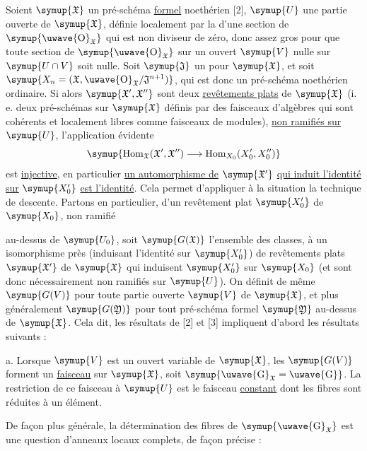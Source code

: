 Soient $\symup{\mathfrak X}$ un pré-schéma \uline{formel} noethérien [2], $\symup{U}$ une partie
ouverte de $\symup{\mathfrak X}$, définie localement par la  d'une
section de $\symup{\text{\uwave{O}}_{\mathfrak X}}$ qui est non
diviseur de zéro, donc assez gros pour
que toute section de $\symup{\text{\uwave{O}}_{\mathfrak X}}$ sur un ouvert $\symup{V}$ nulle sur
$\symup{U\cap V}$ soit nulle. Soit $\symup{\mathfrak J}$ un  pour
$\symup{\mathfrak X}$, et soit $\symup{X_n=(\mathfrak X,\text{\uwave{O}}_{\mathfrak X}/\mathfrak J^{n+1})}$, qui est donc un pré-schéma noethérien ordinaire. Si alors
$\symup{\mathfrak X',\mathfrak X''}$ sont deux \uline{revêtements plats} de $\symup{\mathfrak X}$
(i. e. deux pré-schémas sur $\symup{\mathfrak X}$ définis par des faisceaux d'algèbres
qui sont cohérents et localement libres comme faisceaux de modules), \uline{non
ramifiés sur} $\symup{U}$, l'application évidente
\[
  \symup{\operatorname{Hom}_{\mathfrak X}(\mathfrak X',\mathfrak X'')
  \longrightarrow
  \operatorname{Hom}_{X_0}(X'_0,X''_0)}
\]
est \uline{injective}, en particulier \uline{un automorphisme de} $\symup{\mathfrak X'}$ \uline{qui induit
l'identité sur} $\symup{X'_0}$ \uline{est l'identité}. Cela permet d'appliquer à la situation la
technique de descente. Partons en particulier, d'un revêtement plat $\symup{X'_0}$ de
$\symup{X_0}$, non ramifié

au-dessus de $\symup{U_0}$, soit $\symup{G(\mathfrak X)}$ l'ensemble des classes, à un
isomorphisme près (induisant l'identité sur $\symup{X'_0}$) de revêtements plats
$\symup{\mathfrak X'}$ de $\symup{\mathfrak X}$ qui induisent $\symup{X'_0}$ sur $\symup{X_0}$ (et sont donc
nécessairement non ramifiés sur $\symup{U}$). On définit de même $\symup{G(V)}$ pour toute
partie ouverte $\symup{V}$ de $\symup{\mathfrak X}$, et plus généralement $\symup{G(\mathfrak Y)}$
pour tout pré-schéma formel $\symup{\mathfrak Y}$ au-dessus de $\symup{\mathfrak X}$. Cela dit,
les résultats de [2] et [3] impliquent d'abord les résultats suivants :

\noindent a. Lorsque $\symup{V}$ est un ouvert variable de $\symup{\mathfrak X}$, les $\symup{G(V)}$
forment un \uline{faisceau} sur $\symup{\mathfrak X}$, soit $\symup{\text{\uwave{G}}_{\mathfrak X}=\text{\uwave{G}}}$. La
restriction de ce faisceau à $\symup{U}$ est le faisceau \uline{constant} dont les fibres sont
réduites à un élément.

De façon plus générale, la détermination des fibres de $\symup{\text{\uwave{G}}_{\mathfrak X}}$ est
une question d'anneaux locaux complets, de façon précise :

